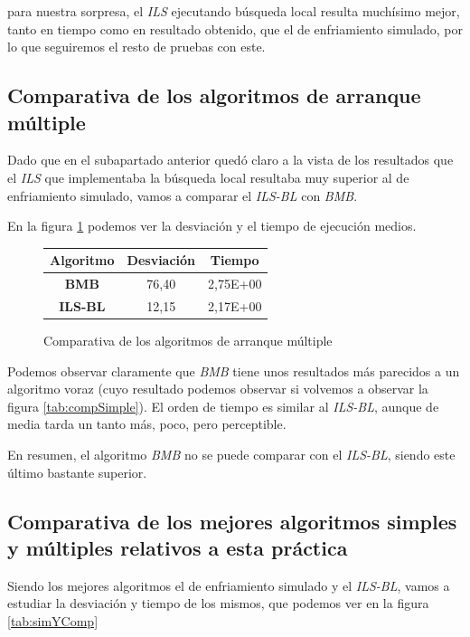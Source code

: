 para nuestra sorpresa, el \textit{ILS} ejecutando búsqueda local resulta muchísimo mejor, tanto en tiempo como en resultado obtenido, que el de enfriamiento simulado, por lo que seguiremos el resto de pruebas con este.

\subsection{Comparativa de los algoritmos de arranque múltiple}

Dado que en el subapartado anterior quedó claro a la vista de los resultados que el \textit{ILS} que implementaba la búsqueda local resultaba muy superior al de enfriamiento simulado, vamos a comparar el \textit{ILS-BL} con \textit{BMB}.

En la figura \ref{tab:compMult} podemos ver la desviación y el tiempo de ejecución medios.

\begin{figure}[H]
    \centering
    \begin{tabular}{|c|c|c|}
        \hline
        Algoritmo & \textbf{Desviación} & \textbf{Tiempo}\\
        \hline
        \textbf{BMB} & 76,40 & 2,75E+00\\
        \hline
        \textbf{ILS-BL} & 12,15 & 2,17E+00\\
        \hline
    \end{tabular}
    \caption{Comparativa de los algoritmos de arranque múltiple}
    \label{tab:compMult}
\end{figure}

Podemos observar claramente que \textit{BMB} tiene unos resultados más parecidos a un algoritmo voraz (cuyo resultado podemos observar si volvemos a observar la figura \ref{tab:compSimple}). El orden de tiempo es similar al \textit{ILS-BL}, aunque de media tarda un tanto más, poco, pero perceptible.

En resumen, el algoritmo \textit{BMB} no se puede comparar con el \textit{ILS-BL}, siendo este último bastante superior.

\subsection{Comparativa de los mejores algoritmos simples y múltiples relativos a esta práctica}

Siendo los mejores algoritmos el de enfriamiento simulado y el \textit{ILS-BL}, vamos a estudiar la desviación y tiempo de los mismos, que podemos ver en la figura \ref{tab:simYComp}

